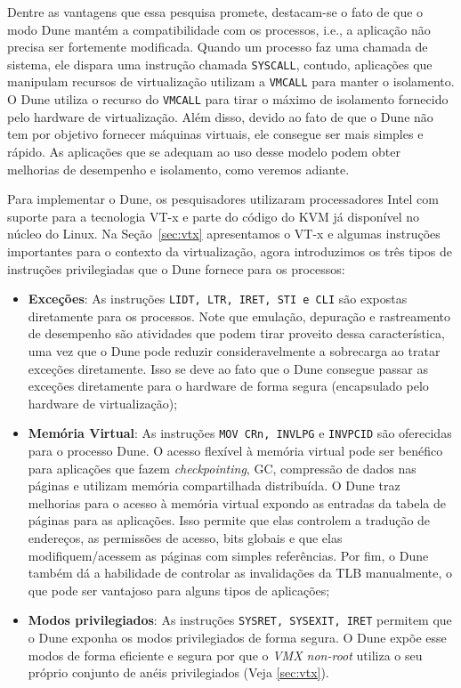 Dentre as vantagens que essa pesquisa promete, destacam-se o fato de que o modo
Dune mantém a compatibilidade com os processos, i.e., a aplicação não precisa
ser fortemente modificada. Quando um processo faz uma chamada de sistema, ele
dispara uma instrução chamada \texttt{SYSCALL}, contudo, aplicações que
manipulam recursos de virtualização utilizam a \texttt{VMCALL} para manter o
isolamento. O Dune utiliza o recurso do \texttt{VMCALL} para tirar o máximo
de isolamento fornecido pelo hardware de virtualização. Além disso, devido ao
fato de que o Dune não tem por objetivo fornecer máquinas virtuais, ele
consegue ser mais simples e rápido. As aplicações que se adequam ao uso desse
modelo podem obter melhorias de desempenho e isolamento, como veremos adiante.

Para implementar o Dune, os pesquisadores utilizaram processadores Intel com
suporte para a tecnologia VT-x e parte do código do KVM já disponível no núcleo do
Linux. Na Seção~\ref{sec:vtx} apresentamos o VT-x e algumas instruções
importantes para o contexto da virtualização, agora introduzimos os três tipos
de instruções privilegiadas que o Dune fornece para os processos:

\begin{itemize}
	\item \textbf{Exceções}:  As instruções \texttt{LIDT, LTR, IRET, STI e CLI} são
        expostas diretamente para os processos. Note que emulação, depuração e
        rastreamento de desempenho são atividades que podem tirar proveito
        dessa característica, uma vez que o Dune pode reduzir consideravelmente
        a sobrecarga ao tratar exceções diretamente. Isso se deve ao fato que o Dune
        consegue passar as exceções diretamente para o hardware de forma segura
        (encapsulado pelo hardware de virtualização);
  \item \textbf{Memória Virtual}: As instruções \texttt{MOV CRn, INVLPG} e
        \texttt{INVPCID} são oferecidas para o processo Dune. O acesso
        flexível à memória virtual pode ser benéfico para aplicações que fazem
        \emph{checkpointing}, GC, compressão de dados nas páginas e utilizam memória
        compartilhada distribuída. O Dune traz melhorias para o acesso à
        memória virtual expondo as entradas da tabela de páginas para as
        aplicações. Isso permite que elas controlem a tradução de endereços,
        as permissões de acesso, bits globais e que elas modifiquem/acessem as páginas com
        simples referências. Por fim, o Dune também dá a habilidade de
        controlar as invalidações da TLB manualmente, o que pode ser vantajoso
        para alguns tipos de aplicações;
  \item \textbf{Modos privilegiados}: As instruções \texttt{SYSRET, SYSEXIT, IRET}
        permitem que o Dune exponha os modos privilegiados de
        forma segura. O Dune expõe esse modos de forma eficiente e segura por
        que o \emph{VMX non-root} utiliza o seu próprio conjunto de anéis privilegiados
        (Veja \ref{sec:vtx}).
\end{itemize}


